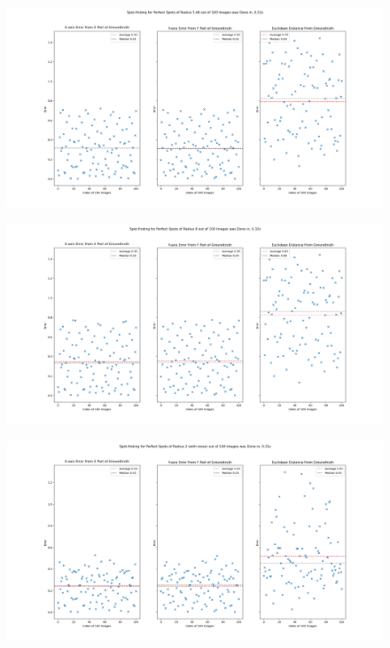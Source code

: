 \documentclass[aps,pra,a4paper,nofootinbib,onecolumn,tightenlines,longbibliography,12pt,amsfonts,amssymb,amsmath,floatfix]{revtex4-2} %
\begin{document}
    \begin{figure}[H]
      \begin{center}
        \includegraphics[width=1.0\textwidth]{project_pics/error_r566.png}
      \end{center}
      \caption{}
      \label{fig:tri_er_r566}
    \end{figure}
    
    \begin{figure}[H]
      \begin{center}
        \includegraphics[width=1.0\textwidth]{project_pics/error_r8.png}
      \end{center}
      \caption{}
      \label{fig:tri_er_r8}
    \end{figure}
    
    \begin{figure}[H]
      \begin{center}
        \includegraphics[width=1.0\textwidth]{project_pics/error_r2_noise.png}
      \end{center}
      \caption{}
      \label{fig:tri_er_r2_noise}
    \end{figure}
    
\end{document}

